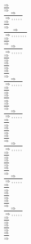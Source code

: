 \documentclass[11pt]{article}
\begin{document}
\begin{center}
\bigskip
\\$\frac{\Rightarrow }{\Rightarrow }$
\bigskip
\\$\frac{\Rightarrow }{\Rightarrow , , , , , }$
\bigskip
\\$\frac{\Rightarrow }{\Rightarrow }$
\bigskip
\\$\frac{\Rightarrow }{\Rightarrow , , , , , , , }$
\bigskip
\\$\frac{\Rightarrow }{\Rightarrow }$
\bigskip
\\$\frac{\Rightarrow }{\Rightarrow , , , , , }$
\bigskip
\\$\frac{\Rightarrow }{\Rightarrow }$
\bigskip
\\$\frac{\Rightarrow }{\Rightarrow }$
\bigskip
\\$\frac{\Rightarrow }{\Rightarrow }$
\bigskip
\\$\frac{\Rightarrow }{\Rightarrow , , , , , }$
\bigskip
\\$\frac{\Rightarrow }{\Rightarrow }$
\bigskip
\\$\frac{\Rightarrow }{\Rightarrow }$
\bigskip
\\$\frac{\Rightarrow }{\Rightarrow }$
\bigskip
\\$\frac{\Rightarrow }{\Rightarrow , , , , , }$
\bigskip
\\$\frac{\Rightarrow }{\Rightarrow }$
\bigskip
\\$\frac{\Rightarrow }{\Rightarrow }$
\bigskip
\\$\frac{\Rightarrow }{\Rightarrow }$
\bigskip
\\$\frac{\Rightarrow }{\Rightarrow , , , , , }$
\bigskip
\\$\frac{\Rightarrow }{\Rightarrow }$
\bigskip
\\$\frac{\Rightarrow }{\Rightarrow }$
\bigskip
\\$\frac{\Rightarrow }{\Rightarrow }$
\bigskip
\\$\frac{\Rightarrow }{\Rightarrow , , , , , }$
\bigskip
\\$\frac{\Rightarrow }{\Rightarrow }$
\bigskip
\\$\frac{\Rightarrow }{\Rightarrow }$
\bigskip
\\$\frac{\Rightarrow }{\Rightarrow }$
\bigskip
\\$\frac{\Rightarrow }{\Rightarrow , , , , , }$
\bigskip
\\$\frac{\Rightarrow }{\Rightarrow }$
\bigskip
\\$\frac{\Rightarrow }{\Rightarrow }$
\bigskip
\\$\frac{\Rightarrow }{\Rightarrow }$

\end{center}
\end{document}
